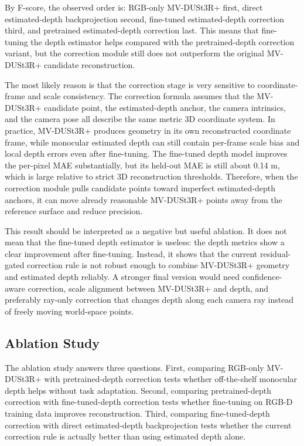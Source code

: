 \documentclass[12pt,a4paper]{article}
\newcommand{\mvdp}{MV-DUSt3R+}
\begin{document}
By F-score, the observed order is: RGB-only \mvdp{} first, direct estimated-depth backprojection second, fine-tuned estimated-depth correction third, and pretrained estimated-depth correction last. This means that fine-tuning the depth estimator helps compared with the pretrained-depth correction variant, but the correction module still does not outperform the original \mvdp{} candidate reconstruction.

The most likely reason is that the correction stage is very sensitive to coordinate-frame and scale consistency. The correction formula assumes that the \mvdp{} candidate point, the estimated-depth anchor, the camera intrinsics, and the camera pose all describe the same metric 3D coordinate system. In practice, \mvdp{} produces geometry in its own reconstructed coordinate frame, while monocular estimated depth can still contain per-frame scale bias and local depth errors even after fine-tuning. The fine-tuned depth model improves the per-pixel MAE substantially, but its held-out MAE is still about 0.14 m, which is large relative to strict 3D reconstruction thresholds. Therefore, when the correction module pulls candidate points toward imperfect estimated-depth anchors, it can move already reasonable \mvdp{} points away from the reference surface and reduce precision.

This result should be interpreted as a negative but useful ablation. It does not mean that the fine-tuned depth estimator is useless: the depth metrics show a clear improvement after fine-tuning. Instead, it shows that the current residual-gated correction rule is not robust enough to combine \mvdp{} geometry and estimated depth reliably. A stronger final version would need confidence-aware correction, scale alignment between \mvdp{} and depth, and preferably ray-only correction that changes depth along each camera ray instead of freely moving world-space points.

\subsection{Ablation Study}
The ablation study answers three questions. First, comparing RGB-only \mvdp{} with pretrained-depth correction tests whether off-the-shelf monocular depth helps without task adaptation. Second, comparing pretrained-depth correction with fine-tuned-depth correction tests whether fine-tuning on RGB-D training data improves reconstruction. Third, comparing fine-tuned-depth correction with direct estimated-depth backprojection tests whether the current correction rule is actually better than using estimated depth alone.
\end{document}
